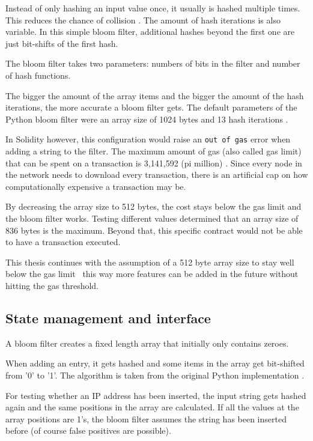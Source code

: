 Instead of only hashing an input value once, it usually is hashed multiple times. This reduces the chance of collision \cite{MultipleHashes}. The amount of hash iterations is also variable. In this simple bloom filter, additional hashes beyond the first one are just bit-shifts of the first hash.

The bloom filter takes two parameters: numbers of bits in the filter and number of hash functions. 

The bigger the amount of the array items and the bigger the amount of the hash iterations, the more accurate a bloom filter gets. The default parameters of the Python bloom filter were an array size of 1024 bytes and 13 hash iterations \cite{SimpleBloomFilter}.

In Solidity however, this configuration would raise an \texttt{out of gas} error when adding a string to the filter. 
The maximum amount of gas (also called gas limit) that can be spent on a transaction is 3,141,592 (pi million) \cite{BlockGasLimit}. Since every node in the network needs to download every transaction, there is an artificial cap on how computationally expensive a transaction may be.

By decreasing the array size to 512 bytes, the cost stays below the gas limit and the bloom filter works. 
Testing different values determined that an array size of 836 bytes is the maximum. Beyond that, this specific contract would not be able to have a transaction executed.

This thesis continues with the assumption of a 512 byte array size to stay well below the gas limit \textemdash \ this way more features can be added in the future without hitting the gas threshold.

\subsection{State management and interface}

A bloom filter creates a fixed length array that initially only contains zeroes.


When adding an entry, it gets hashed and some items in the array get bit-shifted from '0' to '1'. The algorithm is taken from the original Python implementation \cite{SimpleBloomFilter}.



For testing whether an IP address has been inserted, the input string gets hashed again and the same positions in the array are calculated. If all the values at the array positions are 1's, the bloom filter assumes the string has been inserted before (of course false positives are possible).


